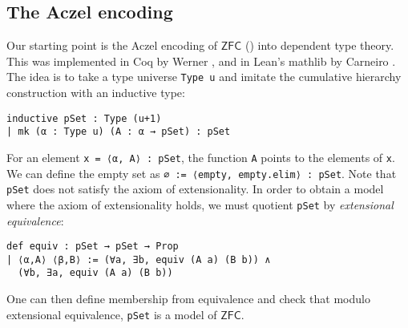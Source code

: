 \documentclass[sigplan,10pt,review]{acmart}
\newcommand{\lil}{\lstinline}
\newcommand{\ZFC}{\mathsf{ZFC}}
\theoremstyle{definition}
\begin{document}
\subsection{The Aczel encoding}
\label{subsect:bset:aczel}
Our starting point is the Aczel encoding of \(\ZFC\) (\cite{aczel1978type, aczel1986type, aczel1982type}) into dependent type theory.
This was implemented in Coq by Werner \cite{werner1997sets}, and in Lean's \textsf{mathlib} by Carneiro \cite{mario1}.
The idea is to take a type universe \lstinline{Type u} and imitate the cumulative hierarchy construction with an inductive type:
\begin{lstlisting}
inductive pSet : Type (u+1)
| mk (α : Type u) (A : α → pSet) : pSet
\end{lstlisting}
For an element \lil{x = ⟨α, A⟩ : pSet}, the function \lil{A} points to the elements of \lil{x}.
We can define the empty set as \lstinline{∅ := ⟨empty, empty.elim⟩ : pSet}.
Note that \lil{pSet} does not satisfy the axiom of extensionality.
In order to obtain a model where the axiom of extensionality holds, we must quotient \lstinline{pSet} by \emph{extensional equivalence}:%
\begin{lstlisting}
def equiv : pSet → pSet → Prop
| ⟨α,A⟩ ⟨β,B⟩ := (∀a, ∃b, equiv (A a) (B b)) ∧
  (∀b, ∃a, equiv (A a) (B b))
\end{lstlisting}
One can then define membership from equivalence and check that modulo extensional equivalence, \lstinline{pSet} is a model of \(\ZFC\).

\end{document}
